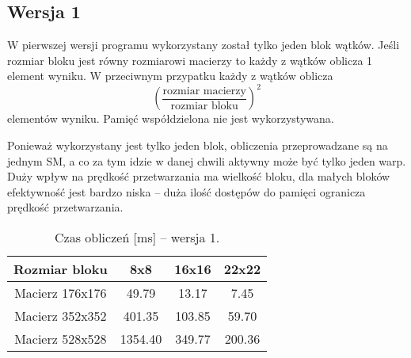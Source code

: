 
\subsection{Wersja 1}

W pierwszej wersji programu wykorzystany został tylko jeden blok wątków. Jeśli rozmiar bloku jest równy rozmiarowi macierzy to każdy z wątków oblicza 1 element wyniku. W przeciwnym przypatku każdy z wątków oblicza $$ {\left(\frac{\text{rozmiar macierzy}}{\text{rozmiar bloku}}\right)}^{2} $$ elementów wyniku. Pamięć współdzielona nie jest wykorzystywana.



Ponieważ wykorzystany jest tylko jeden blok, obliczenia przeprowadzane są na jednym SM, a co za tym idzie w danej chwili aktywny może być tylko jeden warp. \\
Duży wpływ na prędkość przetwarzania ma wielkość bloku, dla małych bloków efektywność jest bardzo niska -- duża ilość dostępów do pamięci ogranicza prędkość przetwarzania.

\begin{table}[H]
\centering
\begin{tabular}{|c|c|c|c|}
\hline
Rozmiar bloku & 8x8 & 16x16 & 22x22 \\ \hline
Macierz 176x176 & 49.79 & 13.17 & 7.45 \\ \hline
Macierz 352x352 & 401.35 & 103.85 & 59.70 \\ \hline
Macierz 528x528 & 1354.40 & 349.77 & 200.36 \\ \hline
\end{tabular}
\caption{Czas obliczeń [ms] -- wersja 1.}
\end{table}

